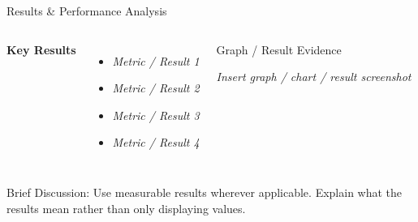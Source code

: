\documentclass[aspectratio=169,11pt]{beamer}
\newcommand{\smallnote}[1]{%
\vspace{0.08cm}
{\scriptsize\color{GEUGrey}#1}
}
\newcommand{\placeholder}[1]{%
\textit{\color{GEUGrey}#1}
}
\begin{document}
\begin{frame}{Results \& Performance Analysis}

\begin{columns}[T,totalwidth=\textwidth]


\textbf{\color{GEUBlue}Key Results}

\begin{itemize}\itemsep3pt
    \item \placeholder{Metric / Result 1}
    \item \placeholder{Metric / Result 2}
    \item \placeholder{Metric / Result 3}
    \item \placeholder{Metric / Result 4}
\end{itemize}


\begin{block}{Graph / Result Evidence}

\centering
\vspace{10mm}

\placeholder{
Insert graph / chart / result screenshot
}

\vspace{10mm}

\end{block}

\end{columns}

\vfill

\smallnote{
Brief Discussion: Use measurable results wherever applicable.
Explain what the results mean rather than only displaying values.
}

\end{frame}
\end{document}

